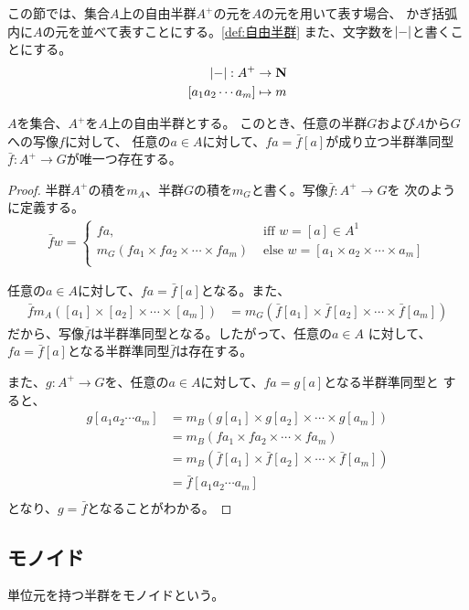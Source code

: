 この節では、集合$A$上の自由半群$A^+$の元を$A$の元を用いて表す場合、
かぎ括弧内に$A$の元を並べて表すことにする。\ref{def:自由半群}
また、文字数を$\left|{-}\right|$と書くことにする。
\begin{equation}\begin{split}
	\left|{-}\right|: A^+ &\to {\mathbf{N}} \\
		[a_1a_2\cdots a_m] &\mapsto m \\
\end{split}\end{equation}

\begin{proposition}[自由半群の普遍性]\label{pro:自由半群の普遍性} %
$A$を集合、$A^+$を$A$上の自由半群とする。
このとき、任意の半群$G$および$A$から$G$への写像$f$に対して、
任意の$a\in A$に対して、$fa=\bar{f}[a]$が成り立つ半群準同型
$\bar{f}:A^+\to G$が唯一つ存在する。
\end{proposition} %

\begin{proof}
半群$A^+$の積を$m_A$、半群$G$の積を$m_G$と書く。写像$\bar{f}:A^+\to G$を
次のように定義する。
\begin{equation*}\begin{split}
	\bar{f}w = \begin{cases}
		fa, &\text{ iff }w = [a] \in A^1 \\
		m_G(fa_1\times fa_2\times \cdots \times fa_m)
			&\text{ else }w = [a_1\times a_2\times \cdots \times a_m] \\
		\end{cases}
\end{split}\end{equation*}

任意の$a\in A$に対して、$fa=\bar{f}[a]$となる。また、
\begin{equation*}\begin{split}
	\bar{f}m_A([a_1] \times [a_2] \times \cdots \times [a_m])
		&= m_G(\bar{f}[a_1]\times \bar{f}[a_2]\times \cdots \times \bar{f}[a_m]) 
\end{split}\end{equation*}
だから、写像$\bar{f}$は半群準同型となる。したがって、任意の$a\in A$
に対して、$fa=\bar{f}[a]$となる半群準同型$\bar{f}$は存在する。

また、$g:A^+\to G$を、任意の$a\in A$に対して、$fa=g[a]$となる半群準同型と
すると、
\begin{equation*}\begin{split}
	g[a_1a_2\cdots a_m] &= m_B(g[a_1]\times g[a_2]\times \cdots \times g[a_m]) \\
		&= m_B(fa_1\times fa_2\times \cdots \times fa_m) \\
		&= m_B(\bar{f}[a_1]\times \bar{f}[a_2]\times \cdots \times \bar{f}[a_m]) \\
		&= \bar{f}[a_1a_2\cdots a_m] \\
\end{split}\end{equation*}
となり、$g=\bar{f}$となることがわかる。
\end{proof}

\subsection{モノイド}\label{s2:モノイド} %
\begin{definition}[モノイド]\label{def:モノイド} %
単位元を持つ半群をモノイドという。
\end{definition} %
